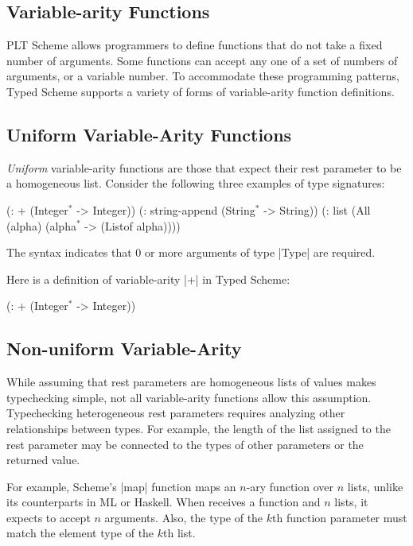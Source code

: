 \begin{schemeregion}
\section{Variable-arity Functions}
\label{sec:varar}
PLT Scheme allows programmers to define functions that do not take a
fixed number of arguments.  Some functions can accept any one of a set
of numbers of arguments, or a variable number.  To accommodate these
programming patterns, Typed Scheme supports a variety of forms of
variable-arity function definitions.  


\subsection{Uniform Variable-Arity Functions}
\label{ssec:uni-va}

\emph{Uniform} variable-arity functions are those that expect their rest parameter to be a
 homogeneous list.  Consider the following three examples of type signatures:
\begin{schemedisplay}
(: + (Integer$^*$ -> Integer))
(: string-append (String$^*$ -> String))
(: list (All (alpha) (alpha$^*$ -> (Listof alpha))))
\end{schemedisplay}
 The syntax  indicates that 0 or more arguments of
 type \scheme|Type| are required.

Here is a definition of variable-arity \scheme|+| in
Typed Scheme:
\begin{exmp}
\begin{schemedisplay}
(: + (Integer$^*$ -> Integer))
\end{schemedisplay}
\label{ex:var-plus}  
\end{exmp}


\subsection{Non-uniform Variable-Arity}
\label{ssec:beyond-uva}

While assuming that rest parameters are homogeneous lists of values
makes typechecking simple, not all variable-arity functions allow this
assumption.  
Typechecking heterogeneous rest
parameters requires analyzing other relationships between types.  For example, the length of
the list assigned to the rest parameter may be connected to the types of
other parameters or the returned value.

For example, Scheme's \scheme|map| function
maps an $n$-ary function over $n$ lists,
 unlike its counterparts in ML or Haskell. When
 receives a function  and $n$ lists, it expects
 to accept $n$ arguments.  Also, the type of the $k$th function
parameter must match the element type of the $k$th list.


\end{schemeregion}
